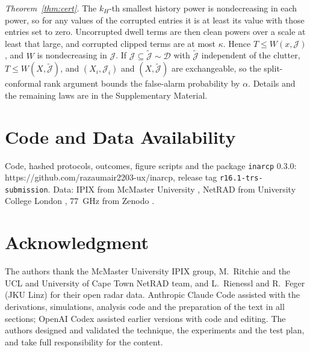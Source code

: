 \documentclass[journal]{IEEEtran}
\begin{document}
\emph{Theorem~\ref{thm:cert}.} The $k_H$-th smallest history power is nondecreasing in each power, so for any values of the corrupted entries it is at least its value with those entries set to zero. Uncorrupted dwell terms are then clean powers over a scale at least that large, and corrupted clipped terms are at most $\kappa$. Hence $T\le W(x,\mathcal J)$, and $W$ is nondecreasing in $\mathcal J$. If $\mathcal J\subseteq\tilde{\mathcal J}\sim\mathcal D$ with $\tilde{\mathcal J}$ independent of the clutter, $T\le W(X,\tilde{\mathcal J})$, and $(X_i,\mathcal J_i)$ and $(X,\tilde{\mathcal J})$ are exchangeable, so the split-conformal rank argument bounds the false-alarm probability by $\alpha$. Details and the remaining laws are in the Supplementary Material.

\section*{Code and Data Availability}
Code, hashed protocols, outcomes, figure scripts and the package \texttt{inarcp} 0.3.0: https://github.com/razaumair2203-ux/inarcp, release tag \texttt{r16.1-trs-submission}. Data: IPIX from McMaster University \cite{ipixweb}, NetRAD from University College London \cite{netrad2026}, 77~GHz from Zenodo \cite{jku2026}.

\section*{Acknowledgment}
The authors thank the McMaster University IPIX group, M.~Ritchie and the UCL and University of Cape Town NetRAD team, and L.~Rienessl and R.~Feger (JKU Linz) for their open radar data. Anthropic Claude Code assisted with the derivations, simulations, analysis code and the preparation of the text in all sections; OpenAI Codex assisted earlier versions with code and editing. The authors designed and validated the technique, the experiments and the test plan, and take full responsibility for the content.



\end{document}
